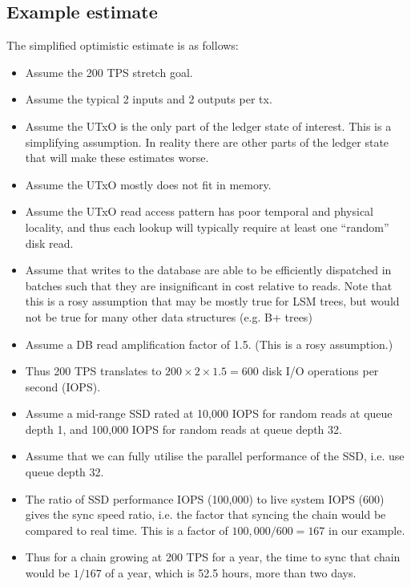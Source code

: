 \documentclass[11pt,a4paper]{article}
\begin{document}
\subsection{Example estimate}
The simplified optimistic estimate is as follows:
\begin{itemize}
\item Assume the 200 TPS stretch goal.
\item Assume the typical 2 inputs and 2 outputs per tx.
\item Assume the UTxO is the only part of the ledger state of interest. This is
      a simplifying assumption. In reality there are other parts of the ledger
      state that will make these estimates worse.
\item Assume the UTxO mostly does not fit in memory.
\item Assume the UTxO read access pattern has poor temporal and physical
      locality, and thus each lookup will typically require at least one
      ``random'' disk read.
\item Assume that writes to the database are able to be efficiently dispatched
        in batches such that they are insignificant in cost relative to reads.
        Note that this is a rosy assumption that may be mostly true for LSM trees,
        but would not be true for many other data structures (e.g. B+ trees)
\item Assume a DB read amplification factor of 1.5. (This is a rosy assumption.)
\item Thus 200 TPS translates to $200 \times 2 \times 1.5 = 600$ disk I/O operations per
      second (IOPS).
\item Assume a mid-range SSD rated at 10,000 IOPS for random reads at queue
      depth 1, and 100,000 IOPS for random reads at queue depth 32.
\item Assume that we can fully utilise the parallel performance of the SSD,
      i.e. use queue depth 32.
\item The ratio of SSD performance IOPS (100,000) to live system IOPS (600)
      gives the sync speed ratio, i.e. the factor that syncing the chain would
      be compared to real time. This is a factor of $100,000 / 600 = 167$ in
      our example.
\item Thus for a chain growing at 200 TPS for a year, the time to sync that
      chain would be $1/167$ of a year, which is 52.5 hours, more than two days.
\end{itemize}
\end{document}

